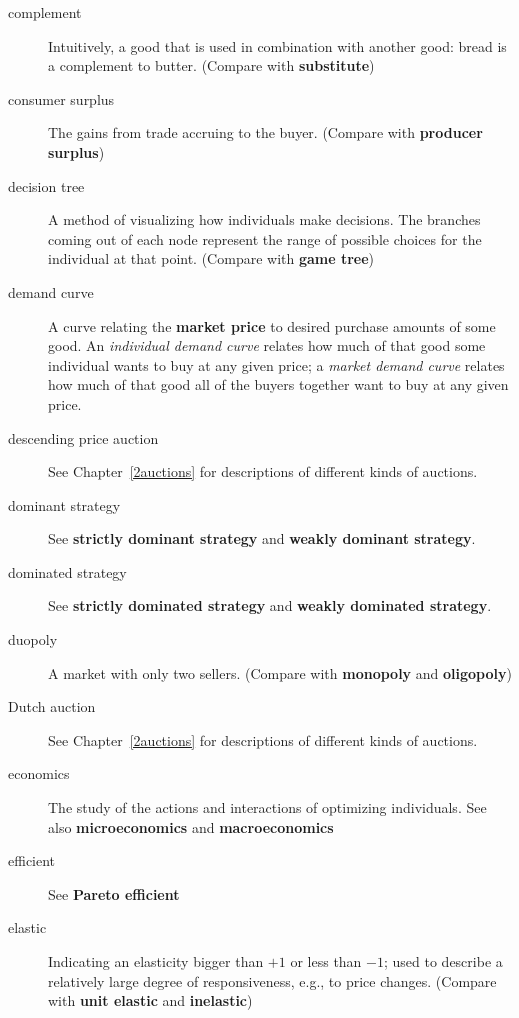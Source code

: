 \begin{description}
\item[complement] Intuitively, a good that is used in combination with another good: bread is a complement to butter. (Compare with \textbf{substitute})

\item[consumer surplus] The gains from trade accruing to the buyer. (Compare with \textbf{producer surplus})

\item[decision tree] A method of visualizing how individuals make decisions. The branches coming out of each node represent the range of possible choices for the individual at that point. (Compare with \textbf{game tree})

\item[demand curve] A curve relating the \textbf{market price} to desired purchase amounts of some good. An \emph{individual demand curve} relates how much of that good some individual wants to buy at any given price; a \emph{market demand curve} relates how much of that good all of the buyers together want to buy at any given price.

\item[descending price auction] See Chapter~\ref{2auctions} for descriptions of different kinds of auctions.

\item[dominant strategy] See \textbf{strictly dominant strategy} and \textbf{weakly dominant strategy}.

\item[dominated strategy] See \textbf{strictly dominated strategy} and \textbf{weakly dominated strategy}.

\item[duopoly] A market with only two sellers. (Compare with \textbf{monopoly} and \textbf{oligopoly})

\item[Dutch auction] See Chapter~\ref{2auctions} for descriptions of different kinds of auctions.

\item[economics] The study of the actions and interactions of optimizing individuals. See also \textbf{microeconomics} and \textbf{macroeconomics} 

\item[efficient] See \textbf{Pareto efficient}

\item[elastic] Indicating an elasticity bigger than $+1$ or less than $-1$; used to describe a relatively large degree of responsiveness, e.g., to price changes. (Compare with \textbf{unit elastic} and \textbf{inelastic})


\end{description}
